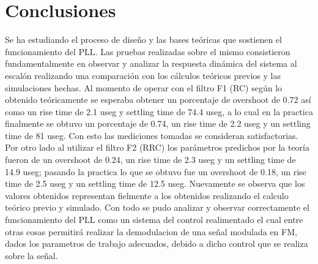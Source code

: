 \documentclass{article}
\begin{document}
\section*{Conclusiones}
Se ha estudiando el proceso de diseño y las bases teóricas que sostienen el funcionamiento del PLL. Las pruebas realizadas sobre el mismo consistieron fundamentalmente en observar y analizar la respuesta dinámica del sistema al escalón realizando una comparación con los cálculos teóricos previos y las simulaciones hechas.
Al momento de operar con el filtro F1 (RC) según lo obtenido teóricamente se esperaba obtener un porcentaje de overshoot de 0.72 así como un rise time de 2.1 useg y settling time de 74.4 useg, a lo cual en la practica finalmente se obtuvo un porcentaje de 0.74, un rise time de 2.2 useg y un settling time de 81 useg. Con esto las mediciones tomadas se consideran satisfactorias. 
Por otro lado al utilizar el filtro F2 (RRC) los parámetros predichos por la teoría fueron de un overshoot de 0.24, un rise time de 2.3 useg y un settling time de 14.9 useg; pasando la practica lo que se obtuvo fue un overshoot de 0.18, un rise time de 2.5 useg y un settling time de 12.5 useg. Nuevamente se observa que los valores obtenidos representan fielmente a los obtenidos realizando el calculo teórico previo y simulado.
Con todo se pudo analizar y observar correctamente el funcionamiento del PLL como un sistema del control realimentado el cual entre otras cosas permitirá realizar la demodulacion de una señal modulada en FM, dados los parametros de trabajo adecuados, debido a dicho control que se realiza sobre la señal.
\end{document}
